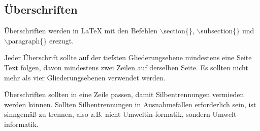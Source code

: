 \subsection{Überschriften}
Überschriften werden in \LaTeX{} mit den Befehlen $\backslash$section\{\}, $\backslash$subsection\{\} und $\backslash$paragraph\{\} erezugt.

Jeder Überschrift sollte auf der tiefsten Gliederungsebene mindestens eine Seite Text folgen, davon mindestens zwei Zeilen auf derselben Seite. Es sollten nicht mehr als vier Gliederungsebenen verwendet werden. 

Überschriften sollten in eine Zeile passen, damit Silbentrennungen vermieden werden können. Sollten Silbentrennungen in Ausnahmefällen erforderlich sein, ist sinngemäß zu trennen, also z.B. nicht Umweltin-formatik, sondern Umwelt-informatik.
